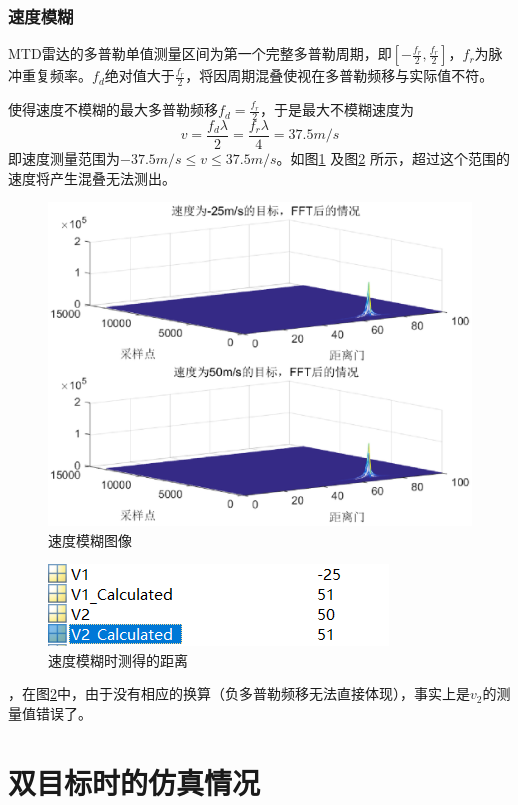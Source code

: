 \documentclass[12pt]{article}
\begin{document}
\subsubsection{速度模糊}
MTD雷达的多普勒单值测量区间为第一个完整多普勒周期，即$\left[-\frac{f_r}{2},\frac{f_r}{2}\right]$，$f_r$为脉冲重复频率。$f_d$绝对值大于$\frac{f_r}{2}$，将因周期混叠使视在多普勒频移与实际值不符。\par 使得速度不模糊的最大多普勒频移$f_d=\frac{f_r}{2}$，于是最大不模糊速度为
\begin{equation}\label{bumohusudu}
  v=\frac{f_d\lambda}{2}=\frac{f_r\lambda}{4}=37.5m/s
\end{equation}
即速度测量范围为$-37.5m/s\leq v\leq 37.5m/s$。如图\ref{sudumohu1}
及图\ref{sudumohu2}
所示，超过这个范围的速度将产生混叠无法测出。
\begin{figure}[htbp]
  \centering
  \includegraphics[width=\textwidth]{sudumohu1}
  \caption{速度模糊图像}\label{sudumohu1}
\end{figure}
\begin{figure}[htbp]
  \centering
  \includegraphics[width=.6\textwidth]{TIM20190623225505}
  \caption{速度模糊时测得的距离}\label{sudumohu2}
\end{figure}
，在图\ref{sudumohu2}中，由于没有相应的换算（负多普勒频移无法直接体现），事实上是$v_2$的测量值错误了。
\section{双目标时的仿真情况}
\setcounter{table}{0}
\setcounter{figure}{0}
\setcounter{equation}{0}
\end{document}
